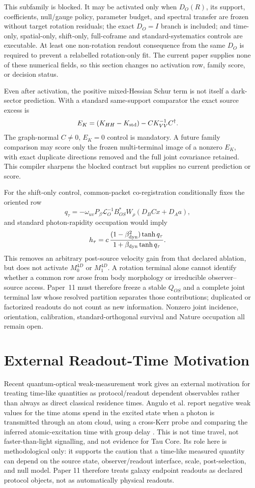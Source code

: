\documentclass[11pt]{article}
\begin{document}
This subfamily is blocked.  It may be activated only when \(D_O(R)\), its
support, coefficients, null/gauge policy, parameter budget, and spectral
transfer are frozen without target rotation residuals; the exact \(D_O=I\)
branch is included; and time-only, spatial-only, shift-only, full-coframe and
standard-systematics controls are executable.  At least one non-rotation
readout consequence from the same \(D_O\) is required to prevent a relabelled
rotation-only fit.  The current paper supplies none of these numerical fields,
so this section changes no activation row, family score, or decision status.

Even after activation, the positive mixed-Hessian Schur term is not itself a
dark-sector prediction.  With a standard same-support comparator the exact
source excess is
\[
 E_K=(K_{HH}-K_{\rm std})-CK_{VV}^{-1}C^\dagger.
\]
The graph-normal \(C\neq0\), \(E_K=0\) control is mandatory.  A future
family comparison may score only the frozen multi-terminal image of a nonzero
\(E_K\), with exact duplicate directions removed and the full joint covariance
retained.  This compiler sharpens the blocked contract but supplies no current
prediction or score.

For the shift-only control, common-packet co-registration conditionally fixes
the oriented row
\[
 q_\tau
 =-\omega_{uv}P_\beta\mathcal L_O^{-1}B_{OS}^{*}W_\rho
   (D_BCx+D_Aa),
\]
and standard photon-rapidity occupation would imply
\[
 h_\tau
 =c\,\frac{(1-\beta_{\rm dyn}^{2})\tanh q_\tau}{1+\beta_{\rm dyn}\tanh q_\tau}.
\]
This removes an arbitrary post-source velocity gain from that declared
ablation, but does not activate \(M_0^{4D}\) or \(M_1^{4D}\).  A rotation
terminal alone cannot identify whether a common row arose from body morphology
or irreducible observer--source access.  Paper~11 must therefore freeze a
stable \(Q_{OS}\) and a complete joint terminal law whose resolved partition
separates those contributions; duplicated or factorized readouts do not count
as new information.  Nonzero joint incidence, orientation, calibration,
standard-orthogonal survival and Nature occupation all remain open.

\section{External Readout-Time Motivation}

Recent quantum-optical weak-measurement work gives an external motivation for
treating time-like quantities as protocol/readout dependent observables rather
than always as direct classical residence times. Angulo et al. report negative
weak values for the time atoms spend in the excited state when a photon is
transmitted through an atom cloud, using a cross-Kerr probe and comparing the
inferred atomic-excitation time with group delay
\cite{anguloNegativeWeakTime2026}. This is not time travel, not
faster-than-light signalling, and not evidence for Tau Core. Its role here is
methodological only: it supports the caution that a time-like measured
quantity can depend on the source state, observer/readout interface, scale,
post-selection, and null model. Paper 11 therefore treats galaxy endpoint
readouts as declared protocol objects, not as automatically physical
readouts.
\end{document}
